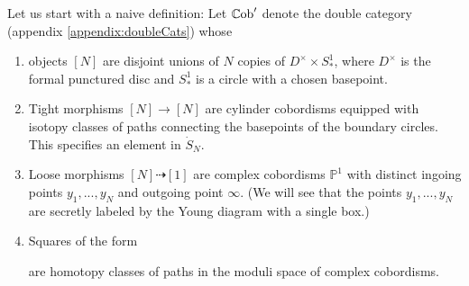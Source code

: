 \documentclass[11pt]{report}
\theoremstyle{definition}
\theoremstyle{remark}
\theoremstyle{remark}
\newcommand{\id}{\textnormal{id}}
\renewcommand{\P}{\mathbb{P}}
\begin{document}
Let us start with a naive definition: Let $\mathbb{C}\textnormal{ob}'$ denote the double category (appendix \ref{appendix:doubleCats}) whose
\begin{enumerate}[label=(\roman*)]
\item objects $[N]$ are disjoint unions of $N$ copies of $D^\times \times S_*^1$, where $D^\times$ is the formal punctured disc and $S_*^1$ is a circle with a chosen basepoint.
\item Tight morphisms $[N] \to [N]$ are cylinder cobordisms equipped with isotopy classes of paths connecting the basepoints of the boundary circles. This specifies an element in $\dot S_N$.
\item Loose morphisms $[N] \dashrightarrow [1]$ are complex cobordisms $\P^1$ with distinct ingoing points $y_1,...,y_N$ and outgoing point $\infty$. (We will see that the points $y_1,...,y_N$ are secretly labeled by the Young diagram with a single box.)
\item Squares of the form
\begin{center}
\end{center}
are homotopy classes of paths in the moduli space of complex cobordisms.
\end{enumerate}
\end{document}

